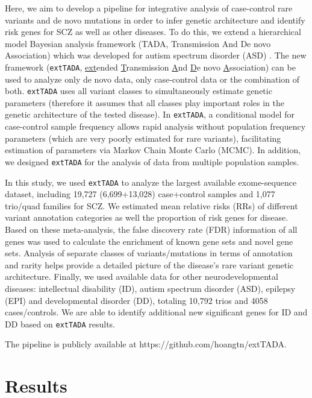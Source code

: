 \documentclass[]{article}
\begin{document}
Here, we aim to develop a pipeline for integrative analysis of case-control
rare variants and de novo mutations in order to infer genetic
architecture and identify risk genes
for SCZ as well as other diseases. To do this, we extend a hierarchical model Bayesian analysis framework
(TADA, Transmission And De novo Association) which was developed for
autism spectrum disorder (ASD) \citep{he2013integrated}. The new
framework (\texttt{extTADA}, \underline{ext}ended \underline{T}ransmission \underline{A}nd \underline{D}e novo \underline{A}ssociation) can
be used to analyze only de novo data, only case-control data or the
combination of both.
\texttt{extTADA} uses all variant classes to
simultaneously estimate genetic parameters (therefore it assumes that all classes play important roles in the genetic architecture of the tested disease). In \texttt{extTADA}, a conditional
model for case-control sample frequency allows rapid analysis without population frequency parameters (which are very poorly estimated for rare variants), facilitating estimation of
parameters via Markov Chain Monte Carlo
(MCMC). In addition, we designed \texttt{extTADA} for the analysis of data from multiple population samples.

In this study, we used \texttt{extTADA} to analyze the largest available exome-sequence dataset, including
19,727 (6,699+13,028) case+control samples and 1,077 trio/quad families for SCZ. We estimated mean relative risks (RRs) of different variant annotation categories as
well the proportion of risk genes for disease. Based on these meta-analysis, the false discovery rate (FDR) information of all genes was used to calculate the enrichment of known gene sets and novel gene sets. Analysis of separate classes of variants/mutations in terms of annotation and rarity helps provide a detailed picture of the disease's rare variant genetic architecture.
Finally, we used available data for other neurodevelopmental diseases: intellectual
disability (ID), autism spectrum disorder (ASD), epilepsy (EPI) and
developmental disorder (DD), totaling 10,792 trios
and 4058 cases/controls. We are able to identify additional new
significant genes for ID and DD based on \texttt{extTADA} results.

The pipeline is publicly available at https://github.com/hoangtn/extTADA.


\section{Results}
\end{document}
